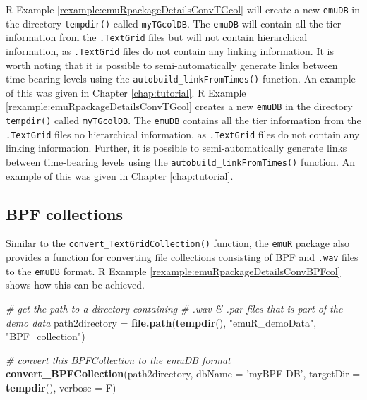 \documentclass[]{book}
\newenvironment{Shaded}{\begin{snugshade}}{\end{snugshade}}
\newcommand{\CommentTok}[1]{\textcolor[rgb]{0.56,0.35,0.01}{\textit{#1}}}
\newcommand{\DataTypeTok}[1]{\textcolor[rgb]{0.13,0.29,0.53}{#1}}
\newcommand{\KeywordTok}[1]{\textcolor[rgb]{0.13,0.29,0.53}{\textbf{#1}}}
\newcommand{\NormalTok}[1]{#1}
\newcommand{\StringTok}[1]{\textcolor[rgb]{0.31,0.60,0.02}{#1}}
\theoremstyle{definition}
\theoremstyle{definition}
\theoremstyle{definition}
\theoremstyle{remark}
\begin{document}
R Example \ref{rexample:emuRpackageDetailsConvTGcol} will create a new
\texttt{emuDB} in the directory \texttt{tempdir()} called
\texttt{myTGcolDB}. The \texttt{emuDB} will contain all the tier
information from the \texttt{.TextGrid} files but will not contain
hierarchical information, as \texttt{.TextGrid} files do not contain any
linking information. It is worth noting that it is possible to
semi-automatically generate links between time-bearing levels using the
\texttt{autobuild\_linkFromTimes()} function. An example of this was
given in Chapter \ref{chap:tutorial}. R Example
\ref{rexample:emuRpackageDetailsConvTGcol} creates a new \texttt{emuDB}
in the directory \texttt{tempdir()} called \texttt{myTGcolDB}. The
\texttt{emuDB} contains all the tier information from the
\texttt{.TextGrid} files no hierarchical information, as
\texttt{.TextGrid} files do not contain any linking information.
Further, it is possible to semi-automatically generate links between
time-bearing levels using the \texttt{autobuild\_linkFromTimes()}
function. An example of this was given in Chapter \ref{chap:tutorial}.

\hypertarget{bpf-collections}{%
\subsection{BPF collections}\label{bpf-collections}}

Similar to the \texttt{convert\_TextGridCollection()} function, the
\texttt{emuR} package also provides a function for converting file
collections consisting of BPF and \texttt{.wav} files to the
\texttt{emuDB} format. R Example
\ref{rexample:emuRpackageDetailsConvBPFcol} shows how this can be
achieved.

\begin{Shaded}
\begin{Highlighting}[]
\CommentTok{# get the path to a directory containing}
\CommentTok{# .wav & .par files that is part of the demo data}
\NormalTok{path2directory =}\StringTok{ }\KeywordTok{file.path}\NormalTok{(}\KeywordTok{tempdir}\NormalTok{(),}
                           \StringTok{"emuR_demoData"}\NormalTok{,}
                           \StringTok{"BPF_collection"}\NormalTok{)}

\CommentTok{# convert this BPFCollection to the emuDB format}
\KeywordTok{convert_BPFCollection}\NormalTok{(path2directory, }\DataTypeTok{dbName =} \StringTok{'myBPF-DB'}\NormalTok{,}
                      \DataTypeTok{targetDir =} \KeywordTok{tempdir}\NormalTok{(), }\DataTypeTok{verbose =}\NormalTok{ F)}
\end{Highlighting}
\end{Shaded}
\end{document}
